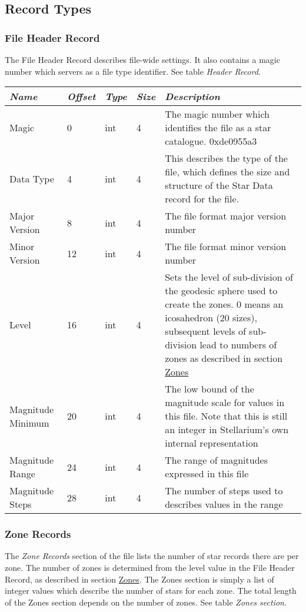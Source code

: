 \subsection{Record Types}\label{record-types}

\subsubsection{File Header Record}\label{file-header-record}

The File Header Record describes file-wide settings. It also contains a
magic number which servers as a file type identifier. See table
\emph{Header Record}.

\begin{longtabu} to \textwidth {l l l l X}
\toprule
\emph{Name} & \emph{Offset} & \emph{Type} & \emph{Size} &
\emph{Description}\tabularnewline
\midrule
Magic & 0 & int & 4 & The magic number which identifies the file as a
star catalogue. 0xde0955a3\tabularnewline
\midrule
Data Type & 4 & int & 4 & This describes the type of the file, which
defines the size and structure of the Star Data record for the
file.\tabularnewline
\midrule
Major Version & 8 & int & 4 & The file format major version
number\tabularnewline
\midrule
Minor Version & 12 & int & 4 & The file format minor version
number\tabularnewline
\midrule
Level & 16 & int & 4 & Sets the level of sub-division of the geodesic
sphere used to create the zones. 0 means an icosahedron (20 sizes),
subsequent levels of sub-division lead to numbers of zones as described
in section \href{Star_Catalogue\#Zones}{Zones}\tabularnewline
\midrule
Magnitude Minimum & 20 & int & 4 & The low bound of the magnitude scale
for values in this file. Note that this is still an integer in
Stellarium's own internal representation\tabularnewline
\midrule
Magnitude Range & 24 & int & 4 & The range of magnitudes expressed in
this file\tabularnewline
\midrule
Magnitude Steps & 28 & int & 4 & The number of steps used to describes
values in the range\tabularnewline
\bottomrule
\end{longtabu}

\subsubsection{Zone Records}\label{zone-records}

The \emph{Zone Records} section of the file lists the number of star
records there are per zone. The number of zones is determined from the
level value in the File Header Record, as described in section
\href{Star_Catalogue\#Zones}{Zones}. The Zones section is simply a list
of integer values which describe the number of stars for each zone. The
total length of the Zones section depends on the number of zones. See
table \emph{Zones section}.

